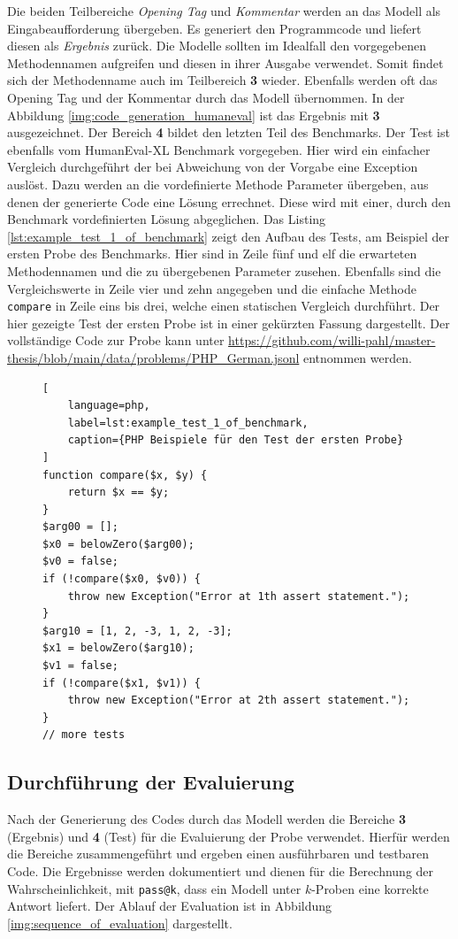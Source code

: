 Die beiden Teilbereiche \textit{Opening Tag} und \textit{Kommentar} werden an das Modell als Eingabeaufforderung übergeben. Es generiert den Programmcode und liefert diesen als \textit{Ergebnis} zurück. Die Modelle sollten im Idealfall den vorgegebenen Methodennamen aufgreifen und diesen in ihrer Ausgabe verwendet. Somit findet sich der Methodenname auch im Teilbereich \textbf{3} wieder. Ebenfalls werden oft das Opening Tag und der Kommentar durch das Modell übernommen. In der Abbildung \ref{img:code_generation_humaneval} ist das Ergebnis mit \textbf{3} ausgezeichnet. Der Bereich \textbf{4} bildet den letzten Teil des Benchmarks. Der Test ist ebenfalls vom HumanEval-XL Benchmark vorgegeben. Hier wird ein einfacher Vergleich durchgeführt der bei Abweichung von der Vorgabe eine Exception auslöst. Dazu werden an die vordefinierte Methode Parameter übergeben, aus denen der generierte Code eine Lösung errechnet. Diese wird mit einer, durch den Benchmark vordefinierten Lösung abgeglichen. Das Listing \ref{lst:example_test_1_of_benchmark} zeigt den Aufbau des Tests, am Beispiel der ersten Probe des Benchmarks. Hier sind in Zeile fünf und elf die erwarteten Methodennamen und die zu übergebenen Parameter zusehen. Ebenfalls sind die Vergleichswerte in Zeile vier und zehn angegeben und die einfache Methode \texttt{compare} in Zeile eins bis drei, welche einen statischen Vergleich durchführt. Der hier gezeigte Test der ersten Probe ist in einer gekürzten Fassung dargestellt. Der vollständige Code zur Probe kann unter \href{https://github.com/willi-pahl/master-thesis/blob/main/data/problems/PHP_German.jsonl}{https://github.com/willi-pahl/master-thesis/blob/main/data/problems/PHP\_German.jsonl} entnommen werden.\vspace{0.2cm}

\begin{figure}
\begin{lstlisting}[
	language=php,
	label=lst:example_test_1_of_benchmark,
	caption={PHP Beispiele für den Test der ersten Probe}
]
function compare($x, $y) {
	return $x == $y;
}
$arg00 = [];
$x0 = belowZero($arg00);
$v0 = false;
if (!compare($x0, $v0)) {
	throw new Exception("Error at 1th assert statement.");
}
$arg10 = [1, 2, -3, 1, 2, -3];
$x1 = belowZero($arg10);
$v1 = false;
if (!compare($x1, $v1)) {
	throw new Exception("Error at 2th assert statement.");
}
// more tests
\end{lstlisting}
\end{figure}


\subsection{Durchführung der Evaluierung}
Nach der Generierung des Codes durch das Modell werden die Bereiche \textbf{3} (Ergebnis) und \textbf{4} (Test) für die Evaluierung der Probe verwendet. Hierfür werden die Bereiche zusammengeführt und ergeben einen ausführbaren und testbaren Code. Die Ergebnisse werden dokumentiert und dienen für die Berechnung der Wahrscheinlichkeit, mit \texttt{pass@k}, dass ein Modell unter $k$-Proben eine korrekte Antwort liefert. Der Ablauf der Evaluation ist in Abbildung \ref{img:sequence_of_evaluation} dargestellt.\vspace{0.2cm}

